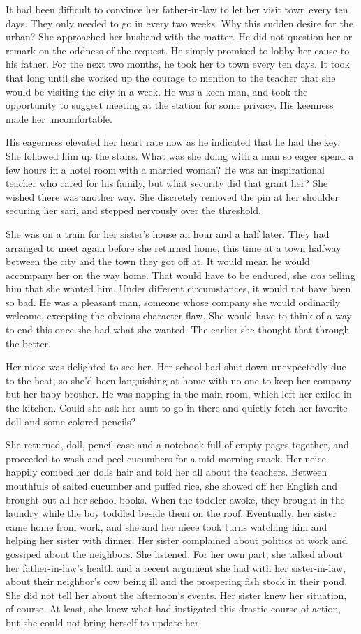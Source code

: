 \documentclass{article}
\begin{document}
It had been difficult to convince her father-in-law to let her visit town every ten days. They only needed to go in every two weeks. Why this sudden desire for the urban? She approached her husband with the matter. He did not question her or remark on the oddness of the request. He simply promised to lobby her cause to his father. For the next two months, he took her to town every ten days. It took that long until she worked up the courage to mention to the teacher that she would be visiting the city in a week. He was a keen man, and took the opportunity to suggest meeting at the station for some privacy. 
His keenness made her uncomfortable.  

His eagerness elevated her heart rate now as he indicated that he had the key. She followed him up the stairs. What was she doing with a man so eager spend a few hours in a hotel room with a married woman? He was an inspirational teacher who cared for his family, but what security did that grant her? She wished there was another way. She discretely removed the pin at her shoulder securing her sari, and stepped nervously over the threshold. 

She was on a train for her sister's house an hour and a half later. They had arranged to meet again before she returned home, this time at a town halfway between the city and the town they got off at. It would mean he would accompany her on the way home. That would have to be endured, she \emph{was} telling him that she wanted him. Under different circumstances, it would not have been so bad. He was a pleasant man, someone whose company she would ordinarily welcome, excepting the obvious character flaw. She would have to think of a way to end this once she had what she wanted. The earlier she thought that through, the better.

Her niece was delighted to see her. Her school had shut down unexpectedly due to the heat, so she'd been languishing at home with no one to keep her company but her baby brother. He was napping in the main room, which left her exiled in the kitchen. Could she ask her aunt to go in there and quietly fetch her favorite doll and some colored pencils?

She returned, doll, pencil case and a notebook full of empty pages together, and proceeded to wash and peel cucumbers for a mid morning snack. Her neice happily combed her dolls hair and told her all about the teachers. Between mouthfuls of salted cucumber and puffed rice, she showed off her English and brought out all her school books. When the toddler awoke, they brought in the laundry while the boy toddled beside them on the roof. Eventually, her sister came home from work, and she and her niece took turns watching him and helping her sister with dinner. Her sister complained about politics at work and gossiped about the neighbors. She listened. For her own part, she talked about her father-in-law's health and a recent argument she had with her sister-in-law, about their neighbor's cow being ill and the prospering fish stock in their pond. She did not tell her about the afternoon's events. Her sister knew her situation, of course. At least, she knew what had instigated this drastic course of action, but she could not bring herself to update her.
\end{document}
